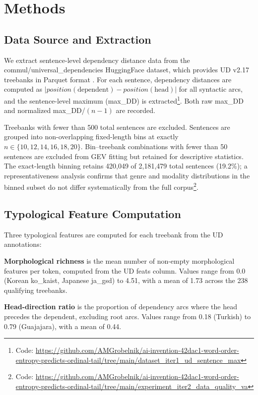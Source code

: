 \documentclass[11pt,letterpaper]{article}
\begin{document}
\section{Methods}\label{sec:methods}

\subsection{Data Source and Extraction}

We extract sentence-level dependency distance data from the commul/universal\_dependencies HuggingFace dataset, which provides UD v2.17 treebanks in Parquet format \cite{deMarneffe2021}. For each sentence, dependency distances are computed as $|position(\text{dependent}) - position(\text{head})|$ for all syntactic arcs, and the sentence-level maximum (max\_DD) is extracted\footnote{Code: \url{https://github.com/AMGrobelnik/ai-invention-42dac1-word-order-entropy-predicts-ordinal-tail/tree/main/dataset_iter1_ud_sentence_max}}. Both raw max\_DD and normalized max\_DD/$(n{-}1)$ are recorded.

Treebanks with fewer than 500 total sentences are excluded. Sentences are grouped into non-overlapping fixed-length bins at exactly $n \in \{10, 12, 14, 16, 18, 20\}$. Bin--treebank combinations with fewer than 50 sentences are excluded from GEV fitting but retained for descriptive statistics. The exact-length binning retains 420,049 of 2,181,479 total sentences (19.2\%); a representativeness analysis confirms that genre and modality distributions in the binned subset do not differ systematically from the full corpus\footnote{Code: \url{https://github.com/AMGrobelnik/ai-invention-42dac1-word-order-entropy-predicts-ordinal-tail/tree/main/experiment_iter2_data_quality_va}}.

\subsection{Typological Feature Computation}

Three typological features are computed for each treebank from the UD annotations:

\textbf{Morphological richness} is the mean number of non-empty morphological features per token, computed from the UD feats column. Values range from 0.0 (Korean ko\_kaist, Japanese ja\_gsd) to 4.51, with a mean of 1.73 across the 238 qualifying treebanks.

\textbf{Head-direction ratio} is the proportion of dependency arcs where the head precedes the dependent, excluding root arcs. Values range from 0.18 (Turkish) to 0.79 (Guajajara), with a mean of 0.44.
\end{document}
